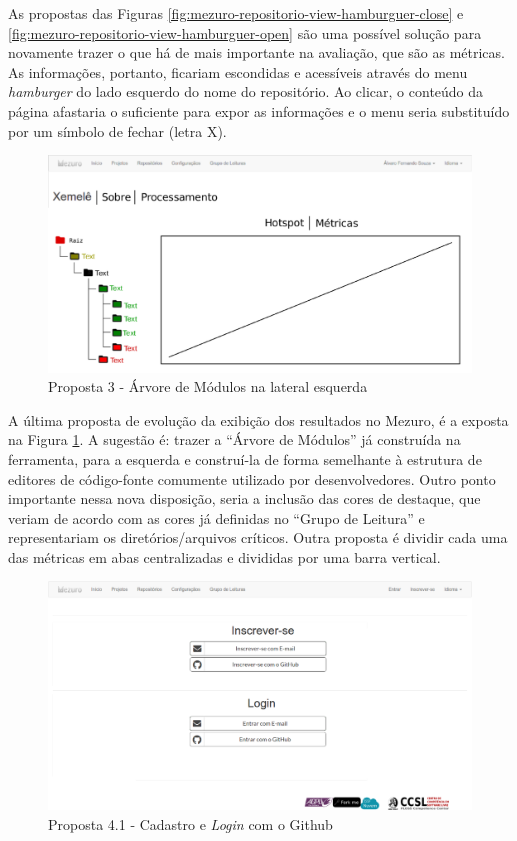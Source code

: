 \newpage

As propostas das Figuras \ref{fig:mezuro-repositorio-view-hamburguer-close} e
\ref{fig:mezuro-repositorio-view-hamburguer-open} são uma possível solução para
novamente trazer o que há de mais importante na avaliação, que são as métricas.
As informações, portanto, ficariam escondidas e acessíveis através do menu
\textit{hamburger} do lado esquerdo do nome do repositório. Ao clicar, o
conteúdo da página afastaria o suficiente para expor as informações e o menu
seria substituído por um símbolo de fechar (letra X).

\begin{figure}[!htb]
	\centering
    \includegraphics[keepaspectratio=true,scale=0.45]
    {figuras/arvore-lateral.eps}
  \caption{Proposta 3 - Árvore de Módulos na lateral esquerda}
  \label{fig:arvore-lateral}
\end{figure}

A última proposta de evolução da exibição dos resultados no Mezuro, é a exposta
na Figura \ref{fig:arvore-lateral}. A sugestão é: trazer a ``Árvore de Módulos''
já construída na ferramenta, para a esquerda e construí-la de forma semelhante
à estrutura de editores de código-fonte comumente utilizado por desenvolvedores.
Outro ponto importante nessa nova disposição, seria a inclusão das cores de
destaque, que veriam de acordo com as cores já definidas no ``Grupo de Leitura''
e representariam os diretórios/arquivos críticos. Outra proposta é dividir cada
uma das métricas em abas centralizadas e divididas por uma barra vertical.

\begin{figure}[!htb]
	\centering
    \includegraphics[keepaspectratio=true,scale=0.35]
    {figuras/mezuro-cadastro-github.eps}
  \caption{Proposta 4.1 - Cadastro e \textit{Login} com o Github}
  \label{fig:mezuro-cadastro-github}
\end{figure}

